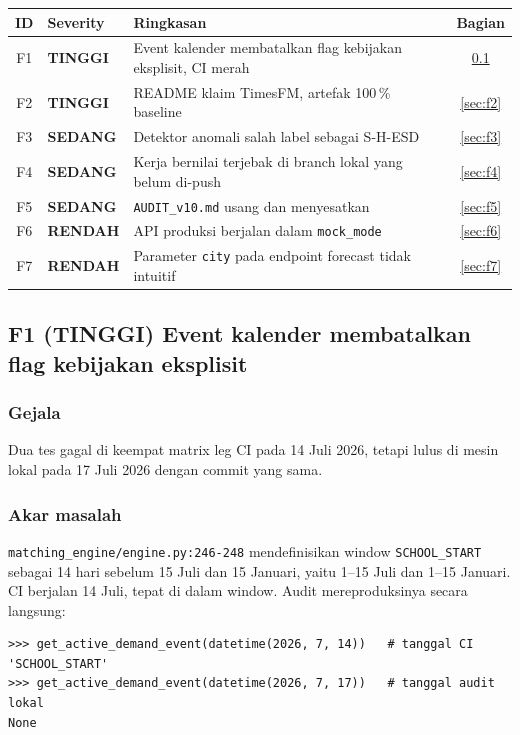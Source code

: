 \documentclass[11pt,a4paper]{article}
\newcommand{\code}[1]{\texttt{\small #1}}
\newcommand{\sevH}{\textcolor{sevhigh}{\textbf{TINGGI}}}
\newcommand{\sevM}{\textcolor{sevmed}{\textbf{SEDANG}}}
\newcommand{\sevL}{\textcolor{sevlow}{\textbf{RENDAH}}}
\begin{document}
\begin{center}
\begin{tabular}{@{}clp{8.6cm}c@{}}
\toprule
\textbf{ID} & \textbf{Severity} & \textbf{Ringkasan} & \textbf{Bagian} \\
\midrule
F1 & \sevH & Event kalender membatalkan flag kebijakan eksplisit, CI merah & \ref{sec:f1} \\
F2 & \sevH & README klaim TimesFM, artefak 100\,\% baseline & \ref{sec:f2} \\
F3 & \sevM & Detektor anomali salah label sebagai S-H-ESD & \ref{sec:f3} \\
F4 & \sevM & Kerja bernilai terjebak di branch lokal yang belum di-push & \ref{sec:f4} \\
F5 & \sevM & \code{AUDIT\_v10.md} usang dan menyesatkan & \ref{sec:f5} \\
F6 & \sevL & API produksi berjalan dalam \code{mock\_mode} & \ref{sec:f6} \\
F7 & \sevL & Parameter \code{city} pada endpoint forecast tidak intuitif & \ref{sec:f7} \\
\bottomrule
\end{tabular}
\end{center}

\subsection{F1 (\sevH) Event kalender membatalkan flag kebijakan eksplisit}
\label{sec:f1}

\subsubsection*{Gejala}

Dua tes gagal di keempat matrix leg CI pada 14 Juli 2026, tetapi lulus di mesin lokal pada 17 Juli
2026 dengan commit yang sama.

\subsubsection*{Akar masalah}

\code{matching\_engine/engine.py:246-248} mendefinisikan window \code{SCHOOL\_START} sebagai 14
hari sebelum 15 Juli dan 15 Januari, yaitu 1--15 Juli dan 1--15 Januari. CI berjalan 14 Juli,
tepat di dalam window. Audit mereproduksinya secara langsung:

\begin{lstlisting}
>>> get_active_demand_event(datetime(2026, 7, 14))   # tanggal CI
'SCHOOL_START'
>>> get_active_demand_event(datetime(2026, 7, 17))   # tanggal audit lokal
None
\end{lstlisting}
\end{document}
